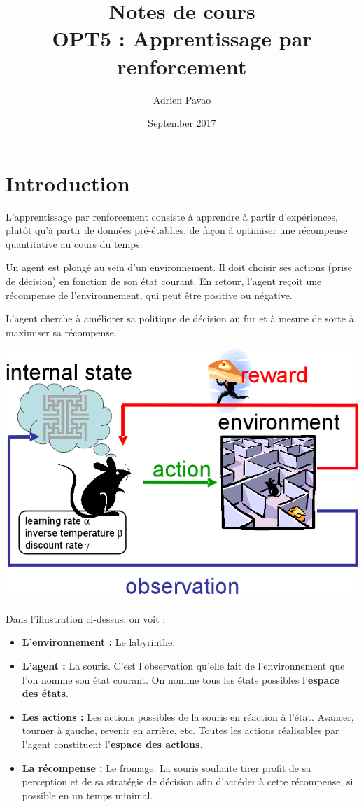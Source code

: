 \documentclass{article}
\title{Notes de cours\\OPT5 : Apprentissage par renforcement}
\author{Adrien Pavao}
\date{September 2017}
\begin{document}
\maketitle

\section{Introduction}

L'apprentissage par renforcement consiste à apprendre à partir d'expériences, plutôt qu'à partir de données pré-établies, de façon à optimiser une récompense quantitative au cours du temps.

Un agent est plongé au sein d'un environnement. Il doit choisir ses actions (prise de décision) en fonction de son état courant. En retour, l'agent reçoit une récompense de l'environnement, qui peut être positive ou négative.

L'agent cherche à améliorer sa politique de décision au fur et à mesure de sorte à maximiser sa récompense.

\includegraphics[scale=0.4]{opt5.png}

Dans l'illustration ci-dessus, on voit :
\begin{itemize}
\item \textbf{L'environnement :} Le labyrinthe.
\item \textbf{L'agent :} La souris. C'est l'observation qu'elle fait de l'environnement que l'on nomme son état courant. On nomme tous les états possibles l'\textbf{espace des états}.
\item \textbf{Les actions :} Les actions possibles de la souris en réaction à l'état. Avancer, tourner à gauche, revenir en arrière, etc. Toutes les actions réalisables par l'agent constituent l'\textbf{espace des actions}.
\item \textbf{La récompense :} Le fromage. La souris souhaite tirer profit de sa perception et de sa stratégie de décision afin d'accéder à cette récompense, si possible en un temps minimal.
\end{itemize}
\end{document}

